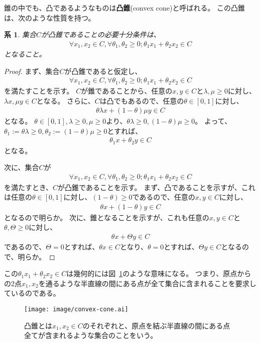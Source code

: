 \documentclass[pdflatex, ja=standard, a4paper]{bxjsarticle}
\newtheorem{corollary}{系}
\newcommand{\figref}[1]{図~\ref{#1}}
\begin{document}
錐の中でも、凸であるようなものは\textbf{凸錐}(convex cone)と呼ばれる。
この凸錐は、次のような性質を持つ。
\begin{corollary}
    集合$C$が凸錐であることの必要十分条件は、
    \begin{align*}
        \forall x_1, x_2 \in C, \forall \theta_1, \theta_2 \geq 0; \theta_1 x_1 + \theta_2 x_2 \in C
    \end{align*}
    となること。
\end{corollary}
\begin{proof}
    まず、集合$C$が凸錐であると仮定し、
    \begin{align*}
        \forall x_1, x_2 \in C, \forall \theta_1, \theta_2 \geq 0; \theta_1 x_1 + \theta_2 x_2 \in C
    \end{align*}
    を満たすことを示す。
    $C$が錐であることから、任意の$x, y \in C$と$\lambda, \mu \geq 0$に対し、$\lambda x, \mu y \in C$となる。
    さらに、$C$は凸でもあるので、任意の$\theta \in [0, 1]$に対し、
    \begin{align*}
        \theta \lambda x + ( 1- \theta) \mu y \in C
    \end{align*}
    となる。
    $\theta \in [0, 1], \lambda \geq 0, \mu \geq 0$より、$\theta \lambda \geq 0, (1 - \theta) \mu \geq 0$。
    よって、$\theta_1 := \theta \lambda \geq 0, \theta_2 := (1 - \theta) \mu \geq 0$とすれば、
    \begin{align*}
        \theta_1 x + \theta_2 y \in C
    \end{align*}
    となる。

    次に、集合$C$が
    \begin{align*}
        \forall x_1, x_2 \in C, \forall \theta_1, \theta_2 \geq 0; \theta_1 x_1 + \theta_2 x_2 \in C
    \end{align*}
    を満たすとき、$C$が凸錐であることを示す。
    まず、凸であることを示すが、これは任意の$\theta \in [0, 1]$に対し、$(1 - \theta) \geq 0$であるので、任意の$x, y \in C$に対し、
    \begin{align*}
        \theta x + (1 - \theta) y \in C
    \end{align*}
    となるので明らか。
    次に、錐となることを示すが、これも任意の$x, y \in C$と$\theta, \Theta \geq 0$に対し、
    \begin{align*}
        \theta x + \Theta y \in C
    \end{align*}
    であるので、$\Theta = 0$とすれば、$\theta x \in C$となり、$\theta = 0$とすれば、$\Theta y \in C$となるので、明らか。
\end{proof}
\noindent
この$\theta_1 x_1 + \theta_2 x_2 \in C$は幾何的には\figref{fig:conve-cone}のような意味になる。
つまり、原点からの2点$x_1, x_2$を通るような半直線の間にある点が全て集合に含まれることを要求しているのである。
\begin{figure}
    \centering
    \texttt{[image: image/convex-cone.ai]}
    \caption{凸錐とは$x_1, x_2 \in C$のそれぞれと、原点を結ぶ半直線の間にある点全てが含まれるような集合のことをいう。}
    \label{fig:conve-cone}
\end{figure}
\end{document}
